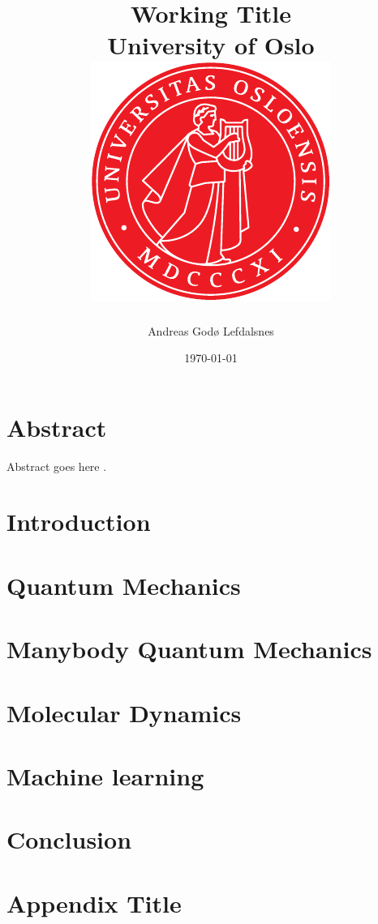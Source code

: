\documentclass[12pt]{report}
\title{
{Working Title}\\
{\Large University of Oslo}\\
{\includegraphics{uio.pdf}}
}
\author{Andreas Godø Lefdalsnes}
\date{\today}
\begin{document}
\maketitle

\chapter*{Abstract}
Abstract goes here \parencite[e.g.][page 300]{einstein}.
 
\tableofcontents

\chapter{Introduction}

 
\chapter{Quantum Mechanics}


\chapter{Manybody Quantum Mechanics}

 
\chapter{Molecular Dynamics}

 
\chapter{Machine learning}

 
\chapter{Conclusion}


\appendix
\chapter{Appendix Title}


\printbibliography
\end{document}
